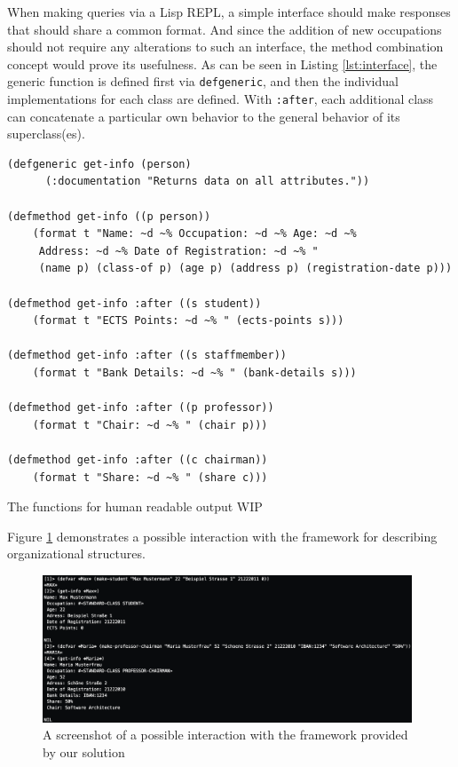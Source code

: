 \documentclass[oribibl]{llncs}
\begin{document}
When making queries via a Lisp REPL, a simple interface should make responses that should share a common format. And since the addition of new occupations should not require any alterations to such an interface, the method combination concept would prove its usefulness. As can be seen in Listing \ref{lst:interface}, the generic function is defined first via \texttt{defgeneric}, and then the individual implementations for each class are defined. With \texttt{:after}, each additional class can concatenate a particular own behavior to the general behavior of its superclass(es).

\begin{listing}[]%
 \centering
\begin{verbatim}
(defgeneric get-info (person)
      (:documentation "Returns data on all attributes."))

(defmethod get-info ((p person))
    (format t "Name: ~d ~% Occupation: ~d ~% Age: ~d ~% 
     Address: ~d ~% Date of Registration: ~d ~% "
     (name p) (class-of p) (age p) (address p) (registration-date p)))

(defmethod get-info :after ((s student))
    (format t "ECTS Points: ~d ~% " (ects-points s)))

(defmethod get-info :after ((s staffmember))
    (format t "Bank Details: ~d ~% " (bank-details s)))

(defmethod get-info :after ((p professor))
    (format t "Chair: ~d ~% " (chair p)))

(defmethod get-info :after ((c chairman))
    (format t "Share: ~d ~% " (share c)))

\end{verbatim}
\caption{The functions for human readable output WIP}
\label{lst:interface}
\end{listing}

Figure \ref{fig:repl} demonstrates a possible interaction with the framework for describing organizational structures.

\begin{figure}[]
    \centering
    \includegraphics[width=0.98\textwidth]{images/repl.png}
    \caption{A screenshot of a possible interaction with the framework provided by our solution}
    \label{fig:repl}
\end{figure}
\end{document}
